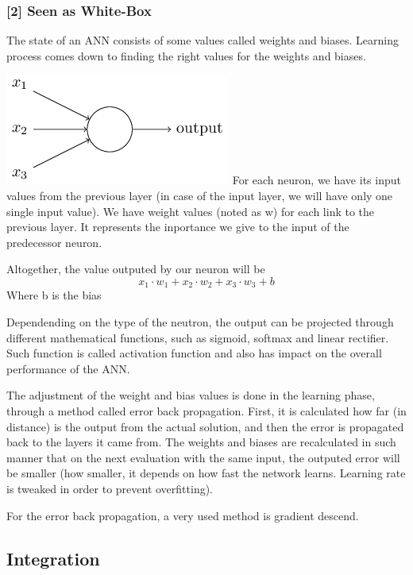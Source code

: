 \documentclass[11pt]{article}
\makeatletter
\def\maxwidth{\ifdim\Gin@nat@width>\linewidth\linewidth
    \else\Gin@nat@width\fi}
\let\Oldincludegraphics\includegraphics
\renewcommand{\includegraphics}[1]{\Oldincludegraphics[width=.8\maxwidth]{#1}}
\makeatother
\begin{document}
\hypertarget{seen-as-white-box}{%
\subsubsection*{{[}2{]} Seen as White-Box}\label{seen-as-white-box}}

The state of an ANN consists of some values called weights and biases.
Learning process comes down to finding the right values for the weights
and biases.

\includegraphics{gfx/neuron.png} For each neuron, we have its input
values from the previous layer (in case of the input layer, we will have
only one single input value). We have weight values (noted as w) for
each link to the previous layer. It represents the inportance we give to
the input of the predecessor neuron.

Altogether, the value outputed by our neuron will be
\[ x_{1}\cdot w_{1} + x_{2}\cdot w_{2} + x_{3}\cdot w_{3} + b \] Where b
is the bias

Dependending on the type of the neutron, the output can be projected
through different mathematical functions, such as sigmoid, softmax and
linear rectifier. Such function is called activation function and also
has impact on the overall performance of the ANN.

The adjustment of the weight and bias values is done in the learning
phase, through a method called error back propagation. First, it is
calculated how far (in distance) is the output from the actual solution,
and then the error is propagated back to the layers it came from. The
weights and biases are recalculated in such manner that on the next
evaluation with the same input, the outputed error will be smaller (how
smaller, it depends on how fast the network learns. Learning rate is
tweaked in order to prevent overfitting).

For the error back propagation, a very used method is gradient descend.

    \hypertarget{integration}{%
\subsection{Integration}\label{integration}}
\end{document}
